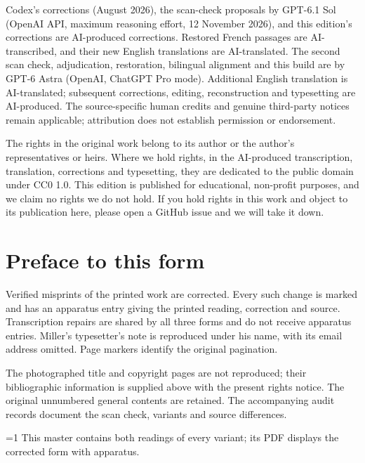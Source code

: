 \documentclass[oneside]{book}
\theoremstyle{sga-source}
\theoremstyle{sga-source-dash}
\theoremstyle{sga-source-dotdash}
\theoremstyle{sga-source-number-note-dash}
\theoremstyle{sga-source-note-number-dotdash}
\theoremstyle{sga-source-example-dotdash}
\theoremstyle{sga-source-inline-number}
\theoremstyle{sga-source-bare-number}
\theoremstyle{sga-source}
\providecommand\EditionIsMaster{1}
\begin{document}
\medskip
Codex’s corrections (August 2026), the scan-check proposals by GPT-6.1 Sol
(OpenAI API, maximum reasoning effort, 12 November 2026), and this edition’s
corrections are AI-produced corrections. Restored French passages are
AI-transcribed, and their new English translations are AI-translated.
The second scan check, adjudication, restoration, bilingual alignment and
this build are by GPT-6 Astra (OpenAI, ChatGPT Pro mode).
Additional English translation is AI-translated; subsequent corrections,
editing, reconstruction and typesetting are AI-produced. The
source-specific human credits and genuine third-party notices remain
applicable; attribution does not establish permission or endorsement.

\medskip
The rights in the original work belong to its author or the author's representatives or heirs.
Where we hold rights, in the AI-produced transcription, translation, corrections and typesetting, they are
dedicated to the public domain under CC0 1.0. This edition is published for educational, non-profit purposes,
and we claim no rights we do not hold. If you hold rights in this work and object to its publication here,
please open a GitHub issue and we will take it down.

\chapter*{Preface to this form}
Verified misprints of the printed work are corrected. Every
such change is marked and has an apparatus entry giving the printed
reading, correction and source. Transcription repairs are shared by all
three forms and do not receive apparatus entries. Miller’s typesetter’s
note is reproduced under his name, with its email address omitted.
Page markers identify the original pagination.

The photographed title and copyright pages are not reproduced; their
bibliographic information is supplied above with the present rights
notice. The original unnumbered general contents are retained. The
accompanying audit records document the scan check, variants and source
differences.

\ifnum\EditionIsMaster=1\relax
This master contains both readings of every variant; its PDF displays the corrected form with apparatus.
\fi

\clearpage

\or
\end{document}
